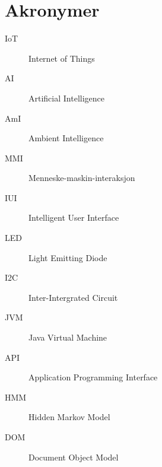 \chapter{Akronymer}
\begin{description}
\item[IoT] Internet of Things
\item[AI] Artificial Intelligence
\item[AmI] Ambient Intelligence
\item[MMI] Menneske-maskin-interaksjon
\item[IUI] Intelligent User Interface
\item[LED] Light Emitting Diode
\item[I2C] Inter-Intergrated Circuit
\item[JVM] Java Virtual Machine
\item[API] Application Programming Interface
\item[HMM] Hidden Markov Model
\item[DOM] Document Object Model
\end{description}